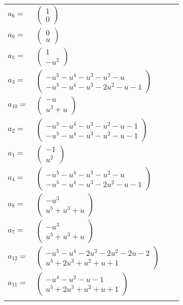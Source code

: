 \documentclass[1p]{elsarticle_modified}
\theoremstyle{definition}
\begin{document}
\begin{tabular}{m{7pt} m{180pt} m{7pt} m{180pt} }
\flushright $a_{6}=$&$\begin{pmatrix}1\\0\end{pmatrix}$ \\
\flushright $a_{9}=$&$\begin{pmatrix}0\\u\end{pmatrix}$ \\
\flushright $a_{5}=$&$\begin{pmatrix}1\\- u^2\end{pmatrix}$ \\
\flushright $a_{3}=$&$\begin{pmatrix}- u^5- u^4- u^3- u^2- u\\- u^5- u^4- u^3-2 u^2- u-1\end{pmatrix}$ \\
\flushright $a_{10}=$&$\begin{pmatrix}- u\\u^3+u\end{pmatrix}$ \\
\flushright $a_{2}=$&$\begin{pmatrix}- u^5- u^4- u^3- u^2- u-1\\- u^5- u^4- u^3- u^2- u-1\end{pmatrix}$ \\
\flushright $a_{1}=$&$\begin{pmatrix}-1\\u^2\end{pmatrix}$ \\
\flushright $a_{4}=$&$\begin{pmatrix}- u^5- u^4- u^3- u^2- u\\- u^5- u^4- u^3-2 u^2- u-1\end{pmatrix}$ \\
\flushright $a_{8}=$&$\begin{pmatrix}- u^3\\u^5+u^3+u\end{pmatrix}$ \\
\flushright $a_{7}=$&$\begin{pmatrix}- u^3\\u^5+u^3+u\end{pmatrix}$ \\
\flushright $a_{12}=$&$\begin{pmatrix}- u^5- u^4-2 u^3-2 u^2-2 u-2\\u^5+2 u^3+u^2+u+1\end{pmatrix}$ \\
\flushright $a_{11}=$&$\begin{pmatrix}- u^4- u^2- u-1\\u^5+2 u^3+u^2+u+1\end{pmatrix}$\\&\end{tabular}
\end{document}
